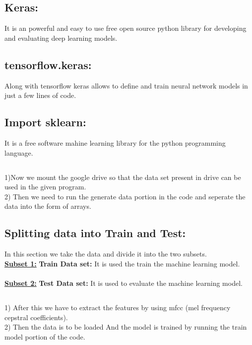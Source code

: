 \documentclass[a4paper,12pt]{article}
\begin{document}
	\subsection{Keras:}It is an powerful and easy to use free open source python library for developing and evaluating deep learning models.\\
	
	\subsection{tensorflow.keras:} Along with tensorflow keras allows to define and train neural network models in just a few lines of code.
	
	
	
	\subsection{Import sklearn:} It is a free software mahine learning library for the python programming language.\\
	
	
	
	
	\subsection{}
	1)Now we mount the google drive so that the data set present in drive can be used in the given program.\\
	2) Then we need to run the generate data portion in the code and seperate the data into the form of arrays.\\
	
	\subsection{Splitting data into Train and Test:}
	In this section we take the data and divide it into the two subsets.\\
	
	
	\textbf{\underline{Subset 1:}} \textbf{Train Data set:} It is used the train the machine learning model.
	\\
	\\
	
	
	\textbf{\underline{Subset 2:}} \textbf{Test Data set:}
	It is used to evaluate the machine learning model.
	
	
	
	
	\subsection{}
    1) After this we have to extract the features by using mfcc (mel frequency cepstral coefficients).\\
	2) Then the data is to be loaded And the model is trained by running the train model portion of the code.
	
\end{document}
